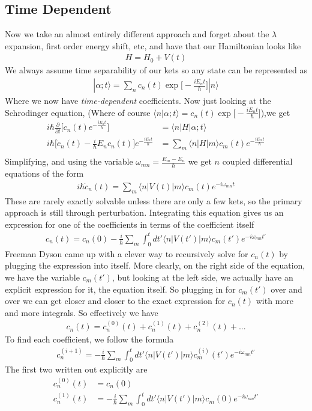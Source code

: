 \subsection{Time Dependent}
Now we take an almost entirely different approach and forget about the $\lambda$ expansion, first order energy shift, etc,  and have that our Hamiltonian looks like
\begin{align}
H = H_0 + V(t)
\end{align}
We always assume time separability of our kets so any state can be represented as
\begin{align}
|\alpha; t\rangle = \sum_n c_n(t)\exp\Big[-\frac{iE_n t}{\hbar}\Big]|n\rangle
\end{align}
Where we now have \emph{time-dependent} coefficients. Now just looking at the Schrodinger equation, (Where of course $\langle n |\alpha;t\rangle = c_n(t)\exp\Big[-\frac{iE_n t}{\hbar}\Big]$),we get
\begin{align}
i\hbar \frac{\partial}{\partial t} \Big[c_n(t)e^{-\frac{iE_n t}{\hbar}}\Big] &= \langle n| H|\alpha; t\rangle\\
i\hbar\Big[\dot{c}_n(t) - \frac{i}{\hbar}E_nc_n(t)\Big]e^{-\frac{iE_n t}{\hbar}} &= \sum_m \langle n| H|m\rangle c_m(t)e^{-\frac{iE_m t}{\hbar}}\\
\end{align}
Simplifying, and using the variable $\omega_{mn} = \frac{E_m-E_n}{\hbar}$ we get $n$ coupled differential equations of the form 
\begin{align}
i\hbar\dot{c}_n(t) = \sum_m \langle n |V(t)|m\rangle c_m(t) e^{-i\omega_{mn}t}
\end{align}
These are rarely exactly solvable unless there are only a few kets, so the primary approach is still through perturbation. Integrating this equation gives us an expression for one of the coefficients in terms of the coefficient itself
\begin{align}
c_n(t) = c_n(0)-\frac{i}{\hbar}\sum_m \int_0^t dt' \langle n |V(t')|m\rangle c_m(t') e^{-i\omega_{mn}t'}
\end{align}
Freeman Dyson came up with a clever way to recursively solve for $c_n(t)$ by plugging the expression into itself. More clearly, on the right side of the equation, we have the variable $c_m(t')$, but looking at the left side, we actually have an explicit expression for it, the equation itself. So plugging in for $c_m(t')$ over and over we can get closer and closer to the exact expression for $c_n(t)$ with more and more integrals. So effectively we have
\begin{align}
c_n(t) = c_n^{(0)}(t) + c_n^{(1)}(t) + c_n^{(2)}(t) + ...
\end{align}
To find each coefficient, we follow the formula
\begin{align}
c_n^{(i+1)} = -\frac{i}{\hbar}\sum_m \int_0^t dt' \langle n |V(t')|m\rangle c_m^{(i)}(t') e^{-i\omega_{mn}t'}
\end{align}
The first two written out explicitly are
\begin{align}
c_n^{(0)}(t) &= c_n(0)\\
c_n^{(1)}(t) &= -\frac{i}{\hbar}\sum_m \int_0^t dt' \langle n |V(t')|m\rangle c_m(0) e^{-i\omega_{mn}t'}
\end{align}


